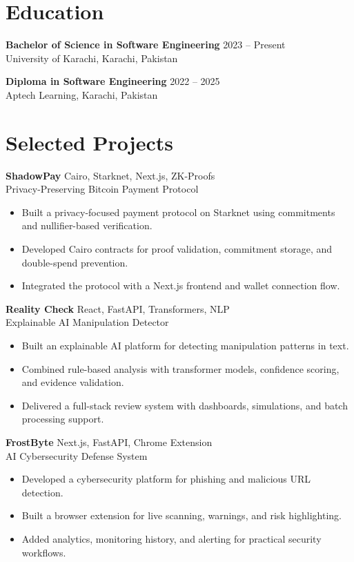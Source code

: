 \documentclass[10pt,a4paper]{article}
\newcommand{\entrymeta}[1]{{\small\color{muted}#1}}
\newcommand{\cvproject}[4]{
  \vspace{0.4em}
  {\bfseries\color{ink}#1} \hfill {\entrymeta{#2}} \\
  {\small\color{accent}#3}
  \begin{itemize}
    #4
  \end{itemize}
}
\begin{document}
\section*{Education}
{\bfseries\color{ink} Bachelor of Science in Software Engineering} \hfill {\entrymeta{2023 -- Present}} \\
University of Karachi, Karachi, Pakistan

\vspace{0.45em}

{\bfseries\color{ink} Diploma in Software Engineering} \hfill {\entrymeta{2022 -- 2025}} \\
Aptech Learning, Karachi, Pakistan

\section*{Selected Projects}

\cvproject
  {ShadowPay}
  {Cairo, Starknet, Next.js, ZK-Proofs}
  {Privacy-Preserving Bitcoin Payment Protocol}
  {
    \item Built a privacy-focused payment protocol on Starknet using commitments and nullifier-based verification.
    \item Developed Cairo contracts for proof validation, commitment storage, and double-spend prevention.
    \item Integrated the protocol with a Next.js frontend and wallet connection flow.
  }

\cvproject
  {Reality Check}
  {React, FastAPI, Transformers, NLP}
  {Explainable AI Manipulation Detector}
  {
    \item Built an explainable AI platform for detecting manipulation patterns in text.
    \item Combined rule-based analysis with transformer models, confidence scoring, and evidence validation.
    \item Delivered a full-stack review system with dashboards, simulations, and batch processing support.
  }

\cvproject
  {FrostByte}
  {Next.js, FastAPI, Chrome Extension}
  {AI Cybersecurity Defense System}
  {
    \item Developed a cybersecurity platform for phishing and malicious URL detection.
    \item Built a browser extension for live scanning, warnings, and risk highlighting.
    \item Added analytics, monitoring history, and alerting for practical security workflows.
  }
\end{document}
